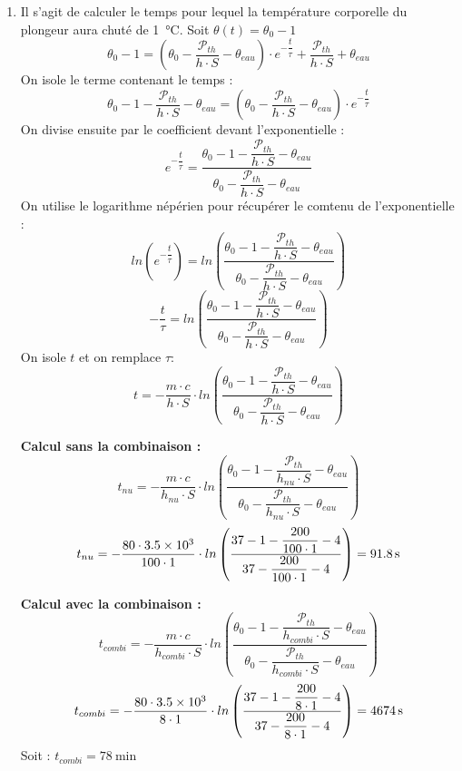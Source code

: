 \documentclass[a4paper,11pt,fleqn]{article}%
\begin{document}
	\begin{enumerate}[resume]
		\item Il s'agit de calculer le temps pour lequel la température corporelle du plongeur aura chuté de \SI{1}{\celsius}. Soit $\theta(t) = \theta_0-1$\\
		$$ \theta_0-1 =  \left( \theta_0 - \dfrac{ \mathcal{P}_{th}}{h \cdot S} - \theta_{eau}\right)\cdot e^{-\dfrac{t}{\tau}} + \dfrac{ \mathcal{P}_{th}}{h \cdot S} + \theta_{eau}$$
		On isole le terme contenant le temps :
		$$ \theta_0-1 - \dfrac{ \mathcal{P}_{th}}{h \cdot S} - \theta_{eau}=  \left( \theta_0 - \dfrac{ \mathcal{P}_{th}}{h \cdot S} - \theta_{eau}\right)\cdot e^{-\dfrac{t}{\tau}} $$
		On divise ensuite par le coefficient devant l'exponentielle :
		$$ e^{-\dfrac{t}{\tau}}  = \dfrac{\theta_0-1 - \dfrac{ \mathcal{P}_{th}}{h \cdot S} - \theta_{eau}} { \theta_0 - \dfrac{ \mathcal{P}_{th}}{h \cdot S} - \theta_{eau}}$$
		On utilise le logarithme népérien pour récupérer le comtenu de l'exponentielle :
		$$ ln(e^{-\dfrac{t}{\tau}}) = ln\left(\dfrac{\theta_0-1 - \dfrac{ \mathcal{P}_{th}}{h \cdot S} - \theta_{eau}} { \theta_0 - \dfrac{ \mathcal{P}_{th}}{h \cdot S} - \theta_{eau}}\right)$$
		$$ -\dfrac{t}{\tau} = ln\left(\dfrac{\theta_0-1 - \dfrac{ \mathcal{P}_{th}}{h \cdot S} - \theta_{eau}} { \theta_0 - \dfrac{ \mathcal{P}_{th}}{h \cdot S} - \theta_{eau}}\right)$$
		On isole $t$  et on remplace $\tau$:
		$$ t = - \dfrac{m \cdot c}{h\cdot S} \cdot ln\left(\dfrac{\theta_0-1 - \dfrac{ \mathcal{P}_{th}}{h \cdot S} - \theta_{eau}} { \theta_0 - \dfrac{ \mathcal{P}_{th}}{h \cdot S} - \theta_{eau}}\right)$$
		
		\textbf{Calcul sans la combinaison :}
		$$ t_{nu} = - \dfrac{m \cdot c}{h_{nu}\cdot S} \cdot ln\left(\dfrac{\theta_0-1 - \dfrac{ \mathcal{P}_{th}}{h_{nu} \cdot S} - \theta_{eau}} { \theta_0 - \dfrac{ \mathcal{P}_{th}}{h_{nu} \cdot S} - \theta_{eau}}\right)$$
		$$ t_{nu} = - \dfrac{80 \cdot \num{3,5E3}}{100 \cdot 1} \cdot ln\left(\dfrac{37-1 - \dfrac{ 200}{100 \cdot 1} - 4} { 37 - \dfrac{ 200}{100 \cdot 1} - 4}\right) = \SI{91,8}{\second}$$
		
		\textbf{Calcul avec la combinaison :}
		$$ t_{combi} = - \dfrac{m \cdot c}{h_{combi}\cdot S} \cdot ln\left(\dfrac{\theta_0-1 - \dfrac{ \mathcal{P}_{th}}{h_{combi} \cdot S} - \theta_{eau}} { \theta_0 - \dfrac{ \mathcal{P}_{th}}{h_{combi} \cdot S} - \theta_{eau}}\right)$$
		$$ t_{combi} = - \dfrac{80 \cdot \num{3,5E3}}{8 \cdot 1} \cdot ln\left(\dfrac{37-1 - \dfrac{ 200}{8 \cdot 1} - 4} { 37 - \dfrac{ 200}{8 \cdot 1} - 4}\right) = \SI{4674}{\second}$$
		Soit : $t_{combi} = \SI{78}{\minute}$
	\end{enumerate}
	
\end{document}
